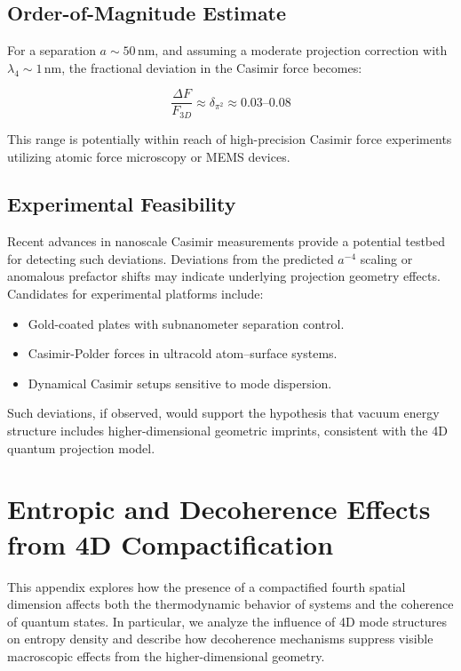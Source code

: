 \documentclass[12pt,a4paper]{article}
\begin{document}
\subsection{Order-of-Magnitude Estimate}

For a separation \(a \sim 50\,\text{nm}\), and assuming a moderate projection correction with \(\lambda_4 \sim 1\,\text{nm}\), the fractional deviation in the Casimir force becomes:

\begin{equation}
\frac{\Delta F}{F_{3D}} \approx \delta_{\pi^2} \approx 0.03\text{–}0.08
\end{equation}

This range is potentially within reach of high-precision Casimir force experiments utilizing atomic force microscopy or MEMS devices.

\subsection{Experimental Feasibility}

Recent advances in nanoscale Casimir measurements provide a potential testbed for detecting such deviations. Deviations from the predicted \(a^{-4}\) scaling or anomalous prefactor shifts may indicate underlying projection geometry effects. Candidates for experimental platforms include:
\begin{itemize}
    \item Gold-coated plates with subnanometer separation control.
    \item Casimir-Polder forces in ultracold atom–surface systems.
    \item Dynamical Casimir setups sensitive to mode dispersion.
\end{itemize}

Such deviations, if observed, would support the hypothesis that vacuum energy structure includes higher-dimensional geometric imprints, consistent with the 4D quantum projection model.


\section{Entropic and Decoherence Effects from 4D Compactification}
\label{app:entropy-decoherence}

This appendix explores how the presence of a compactified fourth spatial dimension affects both the thermodynamic behavior of systems and the coherence of quantum states. In particular, we analyze the influence of 4D mode structures on entropy density and describe how decoherence mechanisms suppress visible macroscopic effects from the higher-dimensional geometry.
\end{document}
